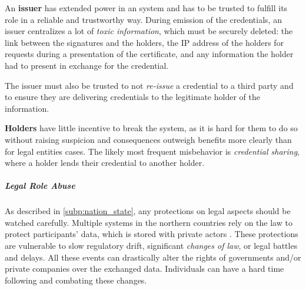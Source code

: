 An \textbf{issuer} has extended power in an \eid system and has to be trusted 
to fulfill its role in a reliable and trustworthy way.
During emission of the credentials, an issuer centralizes a lot of \emph{toxic information}, which must be securely deleted: the link between the signatures and the holders,
the IP address of the holders for requests during a presentation of the certificate, and any information the holder had to present in exchange for the credential.

The issuer must also be trusted to
not \emph{re-issue} a credential to a third party and to ensure they are delivering credentials to the legitimate holder of the information.

\textbf{Holders} have little incentive to break the system, as it is hard for them to do so without raising suspicion and consequences outweigh benefits
more clearly than for legal entities cases.
The likely most frequent misbehavior is \emph{credential sharing}, where a holder lends their credential to another holder.

\subparagraph{Legal Role Abuse}

As described in \ref{subp:nation_state}, any protections on legal aspects should be watched carefully.
Multiple \eid systems in the northern countries rely on the law to protect participants'
data, which is stored with private actors \cite{BankID25}.
These protections are vulnerable to slow regulatory drift, significant \emph{changes of law}, or legal battles and delays.
All these events can drastically alter the rights of governments and/or private companies over the exchanged data.
Individuals can have a hard time following and combating these changes.


